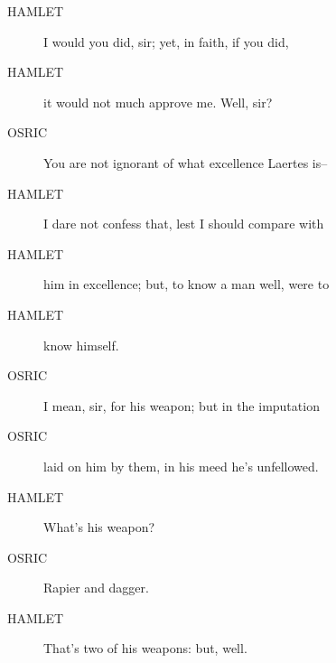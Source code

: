 \documentclass{article}
\begin{document}
\begin{description}
            
\item[HAMLET] I would you did, sir; yet, in faith, if you did,
\item[HAMLET] it would not much approve me. Well, sir?
\end{description}
          
\begin{description}
            
\item[OSRIC] You are not ignorant of what excellence Laertes is--
\end{description}
          
\begin{description}
            
\item[HAMLET] I dare not confess that, lest I should compare with
\item[HAMLET] him in excellence; but, to know a man well, were to
\item[HAMLET] know himself.
\end{description}
          
\begin{description}
            
\item[OSRIC] I mean, sir, for his weapon; but in the imputation
\item[OSRIC] laid on him by them, in his meed he's unfellowed.
\end{description}
          
\begin{description}
            
\item[HAMLET] What's his weapon?
\end{description}
          
\begin{description}
            
\item[OSRIC] Rapier and dagger.
\end{description}
          
\begin{description}
            
\item[HAMLET] That's two of his weapons: but, well.
\end{description}
          
\end{document}
